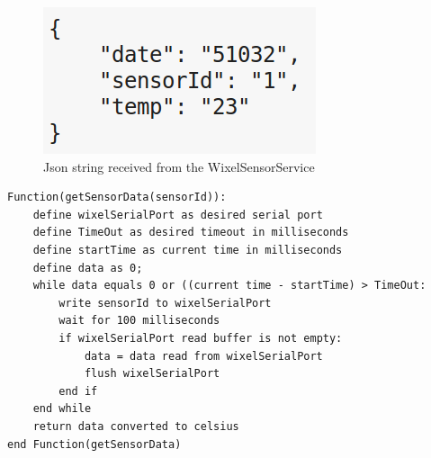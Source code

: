 \begin{figure}[H]
\centering
\includegraphics[width=0.4\linewidth]{graphics/JsonTemp}
\caption{Json\cite{json} string received from the WixelSensorService\label{fig:JsonTemp}}
\end{figure}
\begin{lstlisting}[frame=single, label=pseodoWixelSensorService, caption={Pseudocode of WixelSensorService getSensorData() function}]
Function(getSensorData(sensorId)):
    define wixelSerialPort as desired serial port
    define TimeOut as desired timeout in milliseconds
    define startTime as current time in milliseconds
    define data as 0;
    while data equals 0 or ((current time - startTime) > TimeOut:
        write sensorId to wixelSerialPort
        wait for 100 milliseconds
        if wixelSerialPort read buffer is not empty:
            data = data read from wixelSerialPort
            flush wixelSerialPort
        end if
    end while
    return data converted to celsius
end Function(getSensorData)
\end{lstlisting}

